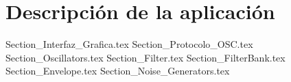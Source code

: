 \chapter{Descripción de la aplicación}

	{Section_Interfaz_Grafica.tex}
	{Section_Protocolo_OSC.tex}
	{Section_Oscillators.tex}
	{Section_Filter.tex}	
	{Section_FilterBank.tex}	
	{Section_Envelope.tex}	
	{Section_Noise_Generators.tex}
